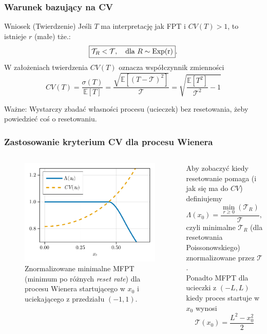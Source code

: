 \documentclass{beamer}
\newcommand{\E}{\mathbb{E}}
\newcommand{\1}{\mathbb{1}}
\newcommand{\T}{\mathcal{T}}
\begin{document}
\begin{frame}
\frametitle{Warunek bazujący na CV}
\begin{block}{Wniosek (Twierdzenie)}
Jeśli $T$ ma interpretację jak FPT i $CV(T) > 1$, to istnieje $r$ (małe) tże.: 
\begin{equation}
\boxed{ \T_R < \T, \quad \text{dla}~ R \sim \rm{Exp}(r) }.
\end{equation}
W założeniach twierdzenia $CV(T)$ oznacza współczynnik zmienności 
\begin{equation}
CV(T) = \frac{\sigma(T)}{\E [T]} = \frac{\sqrt{ \E [(T - \T)^2] }}{\T} = \sqrt{\frac{\E [T^2]}{\T^2} - 1}
\end{equation}
\end{block}

Ważne: {\color{magenta}
Wystarczy zbadać własności procesu (ucieczek) bez resetowania, żeby powiedzieć coś o resetowaniu.
}
\end{frame}

\begin{frame}
\frametitle{Zastosowanie kryterium CV dla  procesu Wienera}
\begin{columns}
\begin{figure}
\includegraphics[width=\textwidth]{wiener-sim/CV-MFPT.pdf}
\caption{Znormalizowane minimalne MFPT (minimum po różnych \emph{reset rate}) dla procesu Wienera startującego w $x_0$ i uciekającego z przedziału $(-1, 1)$.}
\end{figure}

\pause
Aby zobaczyć kiedy resetowanie pomaga (i jak się ma do $CV$) definiujemy
\begin{equation}
\Lambda(x_0) = \frac{\min_{r \ge 0}{(\T_R)}}{\T},
\end{equation}
czyli minimalne $\T_R$ (dla resetowania Poissonowskiego) znormalizowane przez $\T$.\\
Ponadto MFPT dla ucieczki z $(-L, L)$ kiedy proces startuje w $x_0$ wynosi
\begin{equation}
\T(x_0) = \frac{L^2 - x^2_0}{2}
\end{equation}
\end{columns}

\end{frame}
\end{document}
